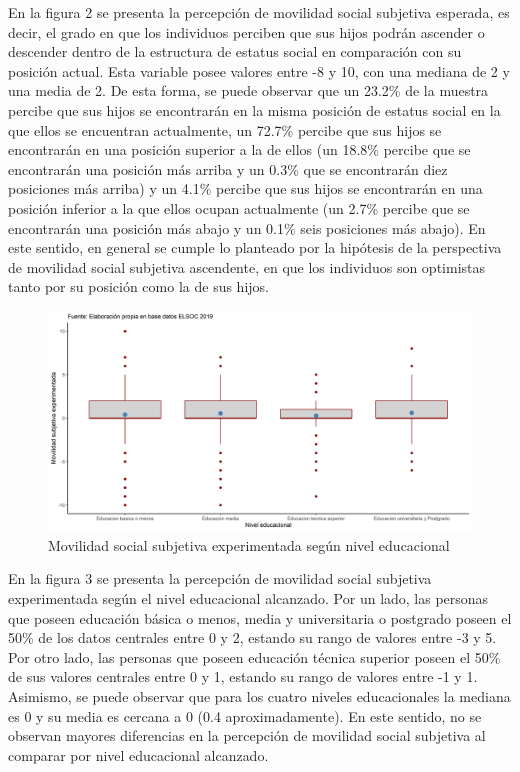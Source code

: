 \documentclass[
]{article}
\begin{document}
En la figura 2 se presenta la percepción de movilidad social subjetiva
esperada, es decir, el grado en que los individuos perciben que sus
hijos podrán ascender o descender dentro de la estructura de estatus
social en comparación con su posición actual. Esta variable posee
valores entre -8 y 10, con una mediana de 2 y una media de 2. De esta
forma, se puede observar que un 23.2\% de la muestra percibe que sus
hijos se encontrarán en la misma posición de estatus social en la que
ellos se encuentran actualmente, un 72.7\% percibe que sus hijos se
encontrarán en una posición superior a la de ellos (un 18.8\% percibe
que se encontrarán una posición más arriba y un 0.3\% que se encontrarán
diez posiciones más arriba) y un 4.1\% percibe que sus hijos se
encontrarán en una posición inferior a la que ellos ocupan actualmente
(un 2.7\% percibe que se encontrarán una posición más abajo y un 0.1\%
seis posiciones más abajo). En este sentido, en general se cumple lo
planteado por la hipótesis de la perspectiva de movilidad social
subjetiva ascendente, en que los individuos son optimistas tanto por su
posición como la de sus hijos.

\begin{figure}

{\centering \includegraphics[width=0.8\linewidth,height=0.8\textheight]{output/graphs/graf3} 

}

\caption{Movilidad social subjetiva experimentada según nivel educacional}\label{fig:unnamed-chunk-8}
\end{figure}

En la figura 3 se presenta la percepción de movilidad social subjetiva
experimentada según el nivel educacional alcanzado. Por un lado, las
personas que poseen educación básica o menos, media y universitaria o
postgrado poseen el 50\% de los datos centrales entre 0 y 2, estando su
rango de valores entre -3 y 5. Por otro lado, las personas que poseen
educación técnica superior poseen el 50\% de sus valores centrales entre
0 y 1, estando su rango de valores entre -1 y 1. Asimismo, se puede
observar que para los cuatro niveles educacionales la mediana es 0 y su
media es cercana a 0 (0.4 aproximadamente). En este sentido, no se
observan mayores diferencias en la percepción de movilidad social
subjetiva al comparar por nivel educacional alcanzado.
\end{document}
